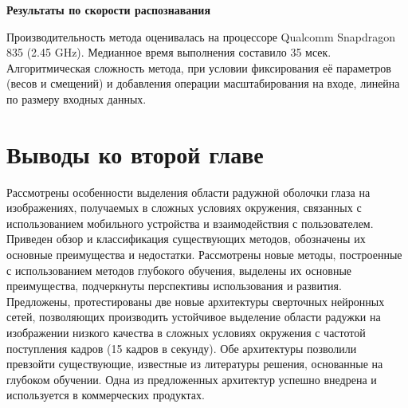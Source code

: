 {\bf Результаты по скорости распознавания}
\label{sec:segm_results_speed}

Производительность метода оценивалась на процессоре Qualcomm Snapdragon 835 (2.45 GHz). Медианное время выполнения составило 35 мсек. Алгоритмическая сложность метода, при условии фиксирования её параметров (весов и смещений) и добавления операции масштабирования на входе, линейна по размеру входных данных.

\section{Выводы ко второй главе}

Рассмотрены особенности выделения области радужной оболочки глаза на изображениях, получаемых в сложных условиях окружения, связанных с использованием мобильного устройства и взаимодействия с пользователем. Приведен обзор и классификация существующих методов, обозначены их основные преимущества и недостатки. Рассмотрены новые методы, построенные с использованием методов глубокого обучения, выделены их основные преимущества, подчеркнуты перспективы использования и развития. Предложены, протестированы две новые архитектуры сверточных нейронных сетей, позволяющих производить устойчивое выделение области радужки на изображении низкого качества в сложных условиях окружения с частотой поступления кадров (15 кадров в секунду). Обе архитектуры позволили превзойти существующие, известные из литературы решения, основанные на глубоком обучении. Одна из предложенных архитектур успешно внедрена и используется в коммерческих продуктах.
